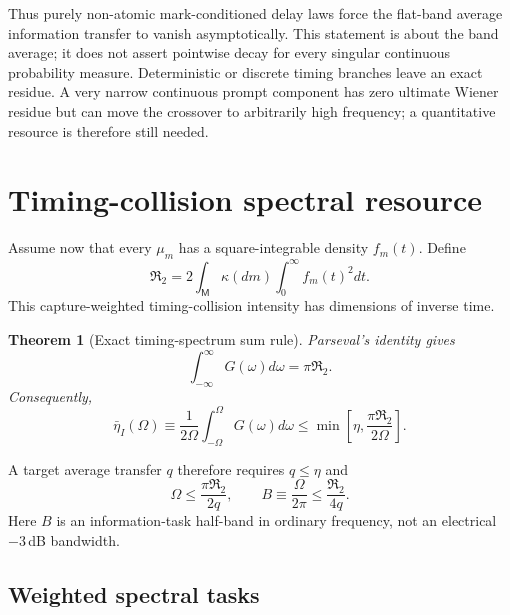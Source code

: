 \documentclass[aps,prapplied,preprint,nofootinbib]{revtex4-2}
\newtheorem{theorem}{Theorem}
\newcommand{\Rtwo}{\mathfrak R_2}
\newcommand{\M}{\mathsf M}
\begin{document}
Thus purely non-atomic mark-conditioned delay laws force the flat-band average information transfer to vanish asymptotically. This statement is about the band average; it does not assert pointwise decay for every singular continuous probability measure. Deterministic or discrete timing branches leave an exact residue. A very narrow continuous prompt component has zero ultimate Wiener residue but can move the crossover to arbitrarily high frequency; a quantitative resource is therefore still needed.

\section{Timing-collision spectral resource}

Assume now that every $\mu_m$ has a square-integrable density $f_m(t)$. Define
\begin{equation}
\boxed{
\Rtwo=2\int_{\M}\kappa(dm)\int_0^\infty f_m(t)^2dt.}
\label{eq:R2}
\end{equation}
This capture-weighted timing-collision intensity has dimensions of inverse time.

\begin{theorem}[Exact timing-spectrum sum rule]
Parseval's identity gives
\begin{equation}
\boxed{
\int_{-\infty}^{\infty}G(\omega)d\omega=\pi\Rtwo.}
\label{eq:parseval}
\end{equation}
Consequently,
\begin{equation}
\boxed{
\bar\eta_I(\Omega)
\equiv\frac{1}{2\Omega}\int_{-\Omega}^{\Omega}G(\omega)d\omega
\le\min\left[\eta,\frac{\pi\Rtwo}{2\Omega}\right].}
\label{eq:flat}
\end{equation}
\end{theorem}

A target average transfer $q$ therefore requires $q\le\eta$ and
\begin{equation}
\Omega\le\frac{\pi\Rtwo}{2q},
\qquad
B\equiv\frac{\Omega}{2\pi}\le\frac{\Rtwo}{4q}.
\end{equation}
Here $B$ is an information-task half-band in ordinary frequency, not an electrical $-3\,$dB bandwidth.

\subsection{Weighted spectral tasks}
\end{document}
